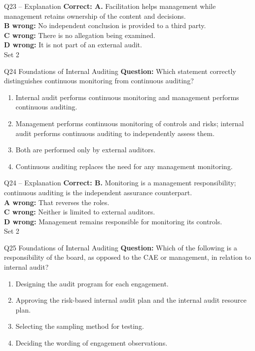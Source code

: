 \documentclass[aspectratio=169,10pt]{beamer}
\begin{document}
\begin{frame}[t]{Q23 -- Explanation}
	\footnotesize
	\textbf{Correct: A.} Facilitation helps management while management retains ownership of the content and decisions. \\[5pt]
\textbf{B wrong:} No independent conclusion is provided to a third party. \\[3pt]
\textbf{C wrong:} There is no allegation being examined. \\[3pt]
\textbf{D wrong:} It is not part of an external audit. \\[3pt]
	\vfill {\tiny Set 2}
\end{frame}

\begin{frame}[t]{Q24 \hfill {\scriptsize Foundations of Internal Auditing}}
	\small
	\textbf{Question:} Which statement correctly distinguishes continuous monitoring from continuous auditing?
	\begin{enumerate}[label=\Alph*.,itemsep=1pt,topsep=3pt]
			\item Internal audit performs continuous monitoring and management performs continuous auditing.
			\item Management performs continuous monitoring of controls and risks; internal audit performs continuous auditing to independently assess them.
			\item Both are performed only by external auditors.
			\item Continuous auditing replaces the need for any management monitoring.
	\end{enumerate}
\end{frame}

\begin{frame}[t]{Q24 -- Explanation}
	\footnotesize
	\textbf{Correct: B.} Monitoring is a management responsibility; continuous auditing is the independent assurance counterpart. \\[5pt]
\textbf{A wrong:} That reverses the roles. \\[3pt]
\textbf{C wrong:} Neither is limited to external auditors. \\[3pt]
\textbf{D wrong:} Management remains responsible for monitoring its controls. \\[3pt]
	\vfill {\tiny Set 2}
\end{frame}

\begin{frame}[t]{Q25 \hfill {\scriptsize Foundations of Internal Auditing}}
	\small
	\textbf{Question:} Which of the following is a responsibility of the board, as opposed to the CAE or management, in relation to internal audit?
	\begin{enumerate}[label=\Alph*.,itemsep=1pt,topsep=3pt]
			\item Designing the audit program for each engagement.
			\item Approving the risk-based internal audit plan and the internal audit resource plan.
			\item Selecting the sampling method for testing.
			\item Deciding the wording of engagement observations.
	\end{enumerate}
\end{frame}
\end{document}
